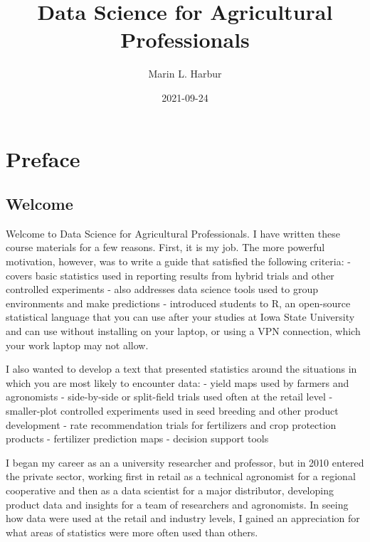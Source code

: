 \documentclass[
]{book}
\title{Data Science for Agricultural Professionals}
\author{Marin L. Harbur}
\date{2021-09-24}
\begin{document}
\maketitle

\renewcommand*\contentsname{Table of Contents}
{
\setcounter{tocdepth}{1}
\tableofcontents
}
\hypertarget{preface}{%
\chapter*{Preface}\label{preface}}

\hypertarget{welcome}{%
\section*{Welcome}\label{welcome}}

Welcome to Data Science for Agricultural Professionals. I have written these course materials for a few reasons. First, it is my job. The more powerful motivation, however, was to write a guide that satisfied the following criteria:
- covers basic statistics used in reporting results from hybrid trials and other controlled experiments
- also addresses data science tools used to group environments and make predictions
- introduced students to R, an open-source statistical language that you can use after your studies at Iowa State University and can use without installing on your laptop, or using a VPN connection, which your work laptop may not allow.

I also wanted to develop a text that presented statistics around the situations in which you are most likely to encounter data:
- yield maps used by farmers and agronomists
- side-by-side or split-field trials used often at the retail level
- smaller-plot controlled experiments used in seed breeding and other product development
- rate recommendation trials for fertilizers and crop protection products
- fertilizer prediction maps
- decision support tools

I began my career as an a university researcher and professor, but in 2010 entered the private sector, working first in retail as a technical agronomist for a regional cooperative and then as a data scientist for a major distributor, developing product data and insights for a team of researchers and agronomists. In seeing how data were used at the retail and industry levels, I gained an appreciation for what areas of statistics were more often used than others.
\end{document}
